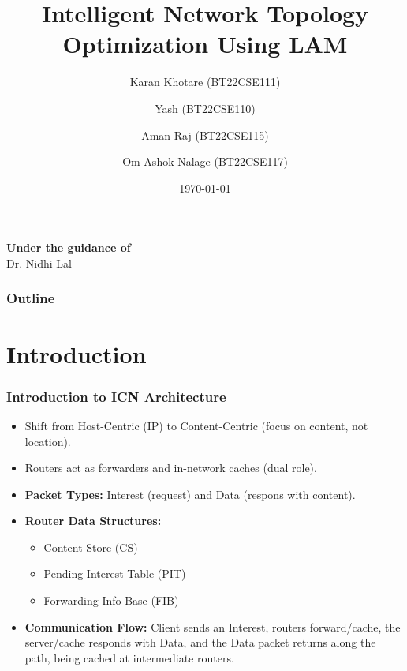 \documentclass{beamer}
\title[Intelligent Network Topology Optimization]{Intelligent Network Topology Optimization Using LAM}
\author{Karan Khotare (BT22CSE111) \and Yash (BT22CSE110) \and Aman Raj (BT22CSE115) \and Om Ashok Nalage (BT22CSE117)}
\institute{Department of Computer Science and Engineering}
\date{\today}
\begin{document}
\begin{frame}
  \maketitle
  \begin{center}
    \vspace{1cm}
    \large
    \textbf{Under the guidance of} \\
    Dr. Nidhi Lal
  \end{center}
\end{frame}

\begin{frame}
  \frametitle{Outline}
  \tableofcontents
\end{frame}

\section{Introduction}
\begin{frame}
  \frametitle{Introduction to ICN Architecture}
  \begin{itemize}
    \item<1-> Shift from Host-Centric (IP) to Content-Centric (focus on content, not location).
    \item<2-> Routers act as forwarders and in-network caches (dual role).
    \item<3-> \textbf{Packet Types:} Interest (request) and Data (respons
    with content).
    \item<4-> \textbf{Router Data Structures:}
    \begin{itemize}
        \item Content Store (CS)
        \item Pending Interest Table (PIT)
        \item Forwarding Info Base (FIB)
    \end{itemize}
    \item<5-> \textbf{Communication Flow:} Client sends an Interest, routers forward/cache, the server/cache responds with Data, and the Data packet returns along the path, being cached at intermediate routers.
  \end{itemize}
\end{frame}

\end{document}
